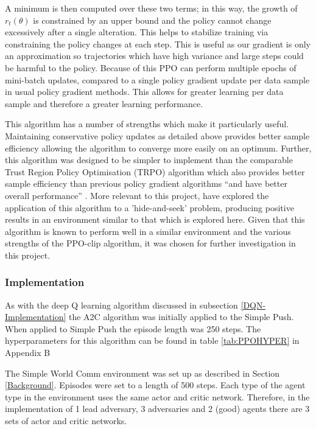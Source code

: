 \documentclass{article}
\begin{document}
A minimum is then computed over these two terms; in this way, the growth of $r_t(\theta)$ is constrained by an upper bound and the policy cannot change excessively after a single alteration.
This helps to stabilize training via constraining the policy changes at each step. This is useful as our gradient is only an approximation so trajectories which have high variance and large steps could be harmful to the policy.
Because of this PPO can perform multiple epochs of mini-batch updates, compared to a single policy gradient update per data sample in usual policy gradient methods.
This allows for greater learning per data sample and therefore a greater learning performance.

This algorithm has a number of strengths which make it particularly useful.
Maintaining conservative policy updates as detailed above provides better sample efficiency allowing the algorithm to converge more easily on an optimum.
Further, this algorithm was designed to be simpler to implement than the comparable Trust Region Policy Optimisation (TRPO) algorithm \citet{trustregionpolicy} which also provides better sample efficiency than previous policy gradient algorithms “and have better overall performance” \citet{PPOAlgo}.
More relevant to this project, \citet{emergenttoolusage} have explored the application of this algorithm to a 'hide-and-seek' problem, producing positive results in an environment similar to that which is explored here.
Given that this algorithm is known to perform well in a similar environment and the various strengths of the PPO-clip algorithm, it was chosen for further investigation in this project.

\subsubsection{Implementation} \label{A2C-Implementation}

As with the deep Q learning algorithm discussed in subsection \ref{DQN-Implementation} the A2C algorithm was initially applied to the Simple Push.
When applied to Simple Push the episode length was 250 steps.
The hyperparameters for this algorithm can be found in table \ref{tab:PPOHYPER} in Appendix B

The Simple World Comm environment was set up as described in Section \ref{Background}.
Episodes were set to a length of 500 steps.
Each type of the agent type in the environment uses the same actor and critic network.
Therefore, in the implementation of 1 lead adversary, 3 adversaries and 2 (good) agents there are 3 sets of actor and critic networks.
\end{document}
